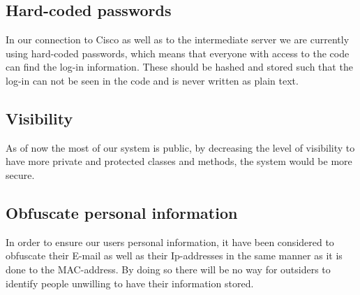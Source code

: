 \subsection*{Hard-coded passwords}
In our connection to Cisco as well as to the intermediate server we are currently using hard-coded passwords, which means that everyone with access to the code can find the log-in information. These should be hashed and stored such that the log-in can not be seen in the code and is never written as plain text. 

\subsection*{Visibility}
As of now the most of our system is public, by decreasing the level of visibility to have more private and protected classes and methods, the system would be more secure.
 
\subsection*{Obfuscate personal information}
In order to ensure our users personal information, it have been considered to obfuscate their E-mail as well as their Ip-addresses in the same manner as it is done to the MAC-address. By doing so there will be no way for outsiders to identify people unwilling to have their information stored.
